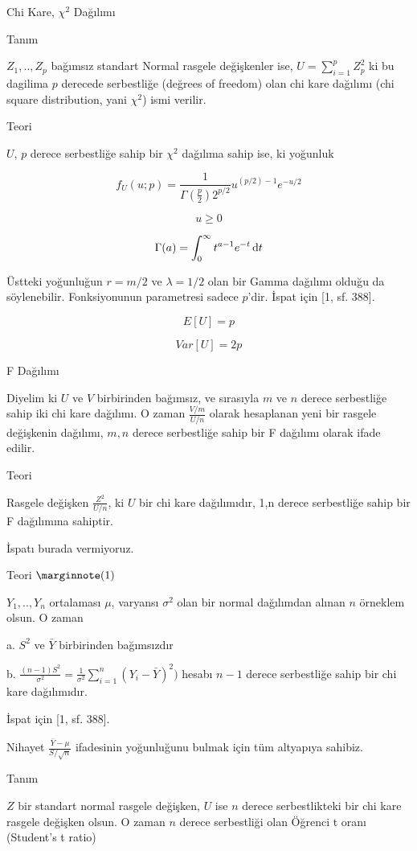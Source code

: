 \documentclass[12pt,fleqn]{article}\usepackage{../../common}
\begin{document}
Chi Kare, $\chi^2$ Dağılımı

Tanım

$Z_1, .. , Z_p$ bağımsız standart Normal rasgele değişkenler ise, $U = \sum_{
  i=1}^{p} Z_p^2$ ki bu dagilima $p$ derecede serbestliğe (değrees of freedom)
olan chi kare dağılımı (chi square distribution, yani $\chi^2$) ismi verilir.

Teori

$U$, $p$ derece serbestliğe sahip bir $\chi^2$ dağılıma sahip ise, ki yoğunluk 

$$
f_U(u;p) = \frac{ 1}{\Gamma(\frac{p}{2}) 2^{p/2}} u^{(p/2) - 1} e^{-u/2} 
$$

$$ u \ge 0 $$

$$ \Gamma(a) = \int_{0}^{\infty} t ^{a-1} e^{-t} \,\mathrm{d} t $$

Üstteki yoğunluğun $r=m/2$ ve $\lambda=1/2$ olan bir Gamma dağılımı olduğu
da söylenebilir. Fonksiyonunun parametresi sadece $p$'dir. İspat için [1,
sf. 388].

$$ E[U] = p $$

$$ Var[U] = 2p $$

F Dağılımı

Diyelim ki $U$ ve $V$ birbirinden bağımsız, ve sırasıyla $m$ ve $n$ derece
serbestliğe sahip iki chi kare dağılımı. O zaman $\frac{V/m}{U/n}$ olarak
hesaplanan yeni bir rasgele değişkenin dağılımı, $m,n$ derece serbestliğe
sahip bir F dağılımı olarak ifade edilir.

Teori

Rasgele değişken $\frac{Z^2}{U/n}$, ki $U$ bir chi kare dağılımıdır, 1,n
derece serbestliğe sahip bir F dağılımına sahiptir. 

İspatı burada vermiyoruz.

Teori $\mlabel{1}$

$Y_1,..,Y_n$ ortalaması $\mu$, varyansı $\sigma^2$ olan bir normal dağılımdan
alınan $n$ örneklem olsun. O zaman

a. $S^2$ ve $\bar{Y}$ birbirinden bağımsızdır

b. $\frac{(n-1)S^2}{\sigma^2}=\frac{1}{\sigma^2}\sum_{i=1}^{n}(Y_i-\bar{Y})^2)$
hesabı $n-1$ derece serbestliğe sahip bir chi kare dağılımıdır.

İspat için [1, sf. 388].

Nihayet $\frac{\bar{Y}-\mu}{S / \sqrt{n}}$ ifadesinin yoğunluğunu bulmak için
tüm altyapıya sahibiz.

Tanım

$Z$ bir standart normal rasgele değişken, $U$ ise $n$ derece serbestlikteki
bir chi kare rasgele değişken olsun. O zaman $n$ derece serbestliği olan
Öğrenci t oranı (Student's t ratio)
\end{document}
